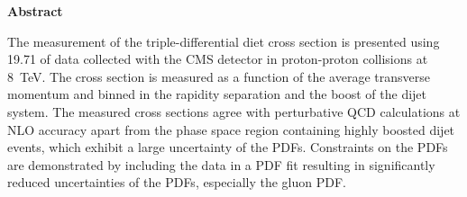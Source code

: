 \thispagestyle{plain}
\begin{center}
    \LARGE{\textbf{Abstract}}\\[2em]
\end{center}
    \normalsize
    The measurement of the triple-differential diet cross section is presented
    using \SI{19.71}{\fbinv} of data collected with the CMS detector in
    proton-proton collisions at \SI{8}{\TeV}. The cross section is measured  as a function
    of the average transverse momentum and binned in the rapidity separation and
    the boost of the dijet system. The measured cross sections agree with
    perturbative QCD calculations at NLO accuracy apart from the phase space
    region containing highly boosted dijet events, which exhibit a large
    uncertainty of the PDFs. Constraints on the PDFs are demonstrated by
    including the data in a PDF fit resulting in significantly reduced
    uncertainties of the PDFs, especially the gluon PDF.
    \vspace{1ex}


\cleardoublepage

